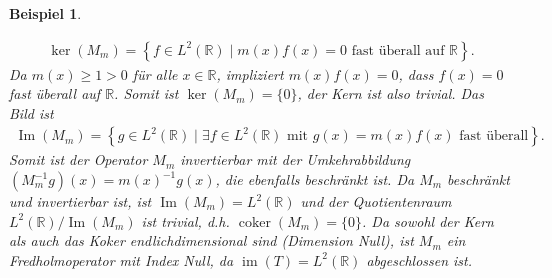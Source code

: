 \documentclass[11pt, hidelinks]{article}
\newcommand{\im}{\operatorname{im}}
\numberwithin{conj}{section}
\newtheorem{example}[conj]{Beispiel}
\begin{document}
\begin{example}
\begin{enumerate}
        \begin{align}
        \ker(M_m) = \left\{ f \in L^2(\mathbb{R}) \mid m(x) f(x) = 0 \text{ fast überall auf } \mathbb{R} \right\}.
        \end{align}
        Da \( m(x) \geq 1 > 0 \) für alle \( x \in \mathbb{R} \), impliziert \( m(x) f(x) = 0 \), dass \( f(x) = 0 \) fast überall auf \( \mathbb{R} \). Somit ist $\ker(M_m) = \{0\}$, der Kern ist also trivial. Das Bild ist
        \begin{align}
            \operatorname{Im}(M_m) = \left\{ g \in L^2(\mathbb{R}) \mid \exists f \in L^2(\mathbb{R}) \text{ mit } g(x) = m(x) f(x) \text{ fast überall} \right\}.
        \end{align}
        Somit ist der Operator \( M_m \) invertierbar mit der Umkehrabbildung $(M_m^{-1} g)(x) = m(x)^{-1} g(x)$, die ebenfalls beschränkt ist. Da \( M_m \) beschränkt und invertierbar ist, ist \( \operatorname{Im}(M_m) = L^2(\mathbb{R}) \) und der Quotientenraum \( L^2(\mathbb{R}) / \operatorname{Im}(M_m) \) ist trivial, d.h. $\operatorname{coker}(M_m) = \{0\}$. Da sowohl der Kern als auch das Koker endlichdimensional sind (Dimension Null), ist \( M_m \) ein Fredholmoperator mit Index Null, da $\im(T) = L^2(\mathbb{R})$ abgeschlossen ist.
    \end{enumerate}
\end{example}
\end{document}
